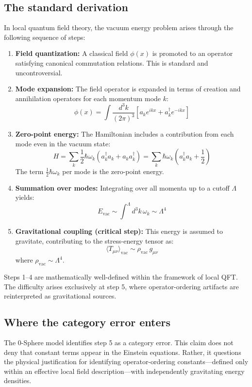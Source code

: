 \documentclass[12pt,letterpaper]{article}
\begin{document}
\subsection{The standard derivation}

In local quantum field theory, the vacuum energy problem arises through the following sequence of steps:

\begin{enumerate}
\item \textbf{Field quantization:} A classical field $\phi(x)$ is promoted to an operator satisfying canonical commutation relations. This is standard and uncontroversial.

\item \textbf{Mode expansion:} The field operator is expanded in terms of creation and annihilation operators for each momentum mode $k$:
\[
\phi(x) = \int \frac{d^3k}{(2\pi)^3} \left[ a_k e^{ikx} + a_k^\dagger e^{-ikx} \right]
\]

\item \textbf{Zero-point energy:} The Hamiltonian includes a contribution from each mode even in the vacuum state:
\[
H = \sum_k \frac{1}{2}\hbar\omega_k (a_k^\dagger a_k + a_k a_k^\dagger) = \sum_k \hbar\omega_k \left(a_k^\dagger a_k + \frac{1}{2}\right)
\]
The term $\frac{1}{2}\hbar\omega_k$ per mode is the zero-point energy.

\item \textbf{Summation over modes:} Integrating over all momenta up to a cutoff $\Lambda$ yields:
\[
E_{\mathrm{vac}} \sim \int^{\Lambda} d^3k \, \omega_k \sim \Lambda^4
\]

\item \textbf{Gravitational coupling (critical step):} This energy is assumed to gravitate, contributing to the stress-energy tensor as:
\[
\langle T_{\mu\nu} \rangle_{\mathrm{vac}} \sim \rho_{\mathrm{vac}} \, g_{\mu\nu}
\]
where $\rho_{\mathrm{vac}} \sim \Lambda^4$.
\end{enumerate}

Steps 1--4 are mathematically well-defined within the framework of local QFT. The difficulty arises exclusively at step 5, where operator-ordering artifacts are reinterpreted as gravitational sources.

\subsection{Where the category error enters}

The 0-Sphere model identifies step 5 as a category error. This claim does not deny that constant terms appear in the Einstein equations. Rather, it questions the physical justification for identifying operator-ordering constants—defined only within an effective local field description—with independently gravitating energy densities.
\end{document}
